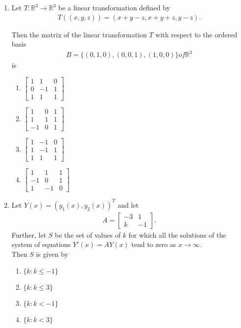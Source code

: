 \documentclass[journal]{IEEEtran}
\newcommand{\myvec}[1]{\begin{bmatrix}#1\end{bmatrix}}
\numberwithin{equation}{enumi}
\numberwithin{figure}{enumi}
\begin{document}
\begin{enumerate}
\item Let $T:\mathbb{R}^3 \rightarrow \mathbb{R}^3$ be a linear transformation defined by
\begin{align*}
T((x, y, z)) = (x + y - z, x + y + z, y - z).
\end{align*}

Then the matrix of the linear transformation $T$ with respect to the ordered basis
\begin{align*}
    B = \{(0,1,0), (0,0,1), (1,0,0)\} of \mathbb{R}^3
\end{align*}
is \hfill{}

\begin{multicols}{2}
    \begin{enumerate}
        \item $\myvec{ 1 & 1 & 0 \\ 0 & -1 & 1 \\ 1 & 1 & 1 }$
        \item $\myvec{ 1 & 0 & 1 \\ 1 & 1 & 1 \\ -1 & 0 & 1 }$
        \item $\myvec{ 1 & -1 & 0 \\ 1 & -1 & 1 \\ 1 & 1 & 1  }$
        \item $\myvec{ 1 & 1 & 1 \\ -1 & 0 & 1 \\ 1 & -1 & 0 }$ 
    \end{enumerate}
    \end{multicols}


\item Let $Y(x) = (y_1(x), y_2(x))^T$ and let
\begin{align*}
A = \myvec{ -3 & 1 \\ k & -1 }.
\end{align*}
Further, let $S$ be the set of values of $k$ for which all the solutions of the system of equations $Y'(x) = A Y(x)$ tend to zero as $x \rightarrow \infty$. 
\\Then $S$ is given by      \hfill{}
\begin{multicols}{2}
    \begin{enumerate}
        \item $\{k : k \leq -1\}$
        \item $\{k : k \leq 3\}$
        \item $\{k : k < -1\}$
        \item  $\{k : k < 3\}$
    \end{enumerate}
    \end{multicols}



\end{enumerate}
\end{document}
